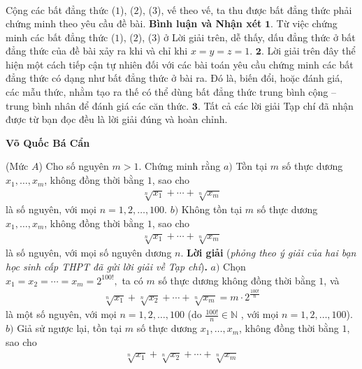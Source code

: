 \begin{multicols}{2}
\begin{align*}
	\end{align*}
	Cộng các bất đẳng thức ($1$), ($2$), ($3$), vế theo vế, ta thu được bất đẳng thức phải chứng minh theo yêu cầu đề bài.
	\vskip 0.05cm
	\textbf{\color{thachthuctoanhoc}Bình luận và Nhận xét}
	\vskip 0.05cm
	$\pmb{1.}$ Từ việc chứng minh các bất đẳng thức ($1$), ($2$), ($3$) ở Lời giải trên, dễ thấy, dấu đẳng thức ở bất đẳng thức của đề bài xảy ra khi và chỉ khi $x = y = z = 1$.
	\vskip 0.05cm
	$\pmb{2.}$ Lời giải trên đây thể hiện một cách tiếp cận tự nhiên đối với các bài toán yêu cầu chứng minh các bất đẳng thức có dạng như bất đẳng thức ở bài ra. Đó là, biến đổi, hoặc đánh giá, các mẫu thức, nhằm tạo ra thế có thể dùng bất đẳng thức trung bình cộng -- trung bình nhân để đánh giá các căn thức.
	\vskip 0.05cm
	$\pmb{3.}$ Tất cả các lời giải Tạp chí đã nhận được từ bạn đọc đều là lời giải đúng và hoàn chỉnh.
	\begin{flushright}
		\textbf{\color{thachthuctoanhoc}Võ Quốc Bá Cẩn}
	\end{flushright}
	{}
	(Mức $A$) Cho số nguyên $m>1$. Chứng minh rằng
	\vskip 0.05cm
	$a)$ Tồn tại $m$ số thực dương $x_1,\ldots,x_m$, không đồng thời bằng $1$, sao cho
	\begin{align*}
		\sqrt[n]{x_1}+\cdots+\sqrt[n]{x_m}
	\end{align*}
	là số nguyên, với mọi $n=1,2,\ldots,100$.
	\vskip 0.05cm
	$b)$ Không tồn  tại $m$ số thực dương $x_1,\ldots,x_m$, không đồng thời bằng $1$, sao cho
	\begin{align*}
		\sqrt[n]{x_1}+\cdots+\sqrt[n]{x_m}
	\end{align*}
	là số nguyên, với mọi số nguyên dương $n$.
	\vskip 0.05cm
	\textbf{\color{thachthuctoanhoc}Lời giải} (\textit{phỏng theo ý giải của hai bạn học sinh cấp THPT đã gửi lời giải về Tạp chí})\textbf{\color{thachthuctoanhoc}.}
	\vskip 0.05cm
	$a)$ Chọn ${x_1} = {x_2} =  \cdots  = {x_m} = {2^{100!}},$  ta có $m$ số thực dương không đồng thời bằng $1$, và
	\begin{align*}
		\sqrt[n]{{{x_1}}} + \sqrt[n]{{{x_2}}} +  \cdots  + \sqrt[n]{{{x_m}}} = m \cdot {2^{\frac{{100!}}{n}}}
	\end{align*}
	là một số nguyên, với mọi $n = 1, 2, \ldots, 100$ (do $\frac{{100!}}{n} \in \mathbb{N}$ , với mọi $n = 1, 2, \ldots, 100$).
	\vskip 0.05cm
	$b)$ Giả sử ngược lại, tồn tại $m$ số thực dương  $x_1, \ldots,x_m$, không đồng thời bằng $1$, sao cho
	\begin{align*}
		\sqrt[n]{{{x_1}}} + \sqrt[n]{{{x_2}}} +  \cdots  + \sqrt[n]{{{x_m}}}

\end{align*}
\end{multicols}
